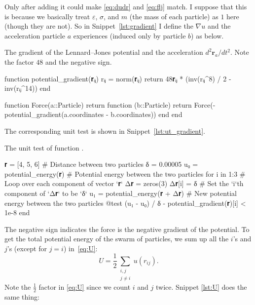 Only after adding it could make \eqref{eq:dudr} and \eqref{eq:flj} match.
I suppose that this is because we basically treat
$\varepsilon$, $\sigma$, and $m$ (the mass of each particle) as $1$ here (though they
are not). So in Snippet~\ref{lst:gradient} I define the $\nabla u$ and the acceleration
particle $a$ experiences (induced only by particle $b$) as below.
%
\begin{algorithm}
    \caption{The gradient of the Lennard--Jones potential and the acceleration
        $d^2 \bm{r}_a / d t^2$. Note the factor $48$ and the negative sign.}
    \label{lst:gradient}
    \begin{juliacode}
        function potential_gradient(𝐫ᵢⱼ)
            rᵢⱼ = norm(𝐫ᵢⱼ)
            return 48𝐫ᵢⱼ * (inv(rᵢⱼ^8) / 2 - inv(rᵢⱼ^14))
        end

        function Force(a::Particle)
            return function (b::Particle)
                return Force(-potential_gradient(a.coordinates - b.coordinates))
            end
        end
    \end{juliacode}
\end{algorithm}
%
The corresponding unit test is shown in Snippet~\ref{lst:ut_gradient}.
%
\begin{algorithm}
    \caption{The unit test of function .}
    \label{lst:ut_gradient}
    \begin{juliacode}
        𝐫 = [4, 5, 6]  # Distance between two particles
        δ = 0.00005
        u₀ = potential_energy(𝐫)  # Potential energy between the two particles
        for i in 1:3  # Loop over each component of vector `𝐫`
            Δ𝐫 = zeros(3)
            Δ𝐫[i] = δ  # Set the `i`th component of `Δ𝐫` to be `δ`
            u₁ = potential_energy(𝐫 + Δ𝐫)  # New potential energy between the two particles
            @test (u₁ - u₀) / δ - potential_gradient(𝐫)[i] < 1e-8
        end
    \end{juliacode}
\end{algorithm}
%
The negative sign indicates the force is the negative gradient of the potential.
To get the total potential energy of the swarm of particles, we sum up all the $i$'s
and $j$'s (except for $j = i$) in~\eqref{eq:U}:
%
\begin{equation}\label{eq:U}
    U = \frac{ 1 }{ 2 }\sum_{\substack{i, j\\ j \neq i}} u(r_{ij}).
\end{equation}
%
Note the $\frac{ 1 }{ 2 }$ factor in \eqref{eq:U} since we count $i$ and $j$ twice.
Snippet \ref{lst:U} does the same thing:

